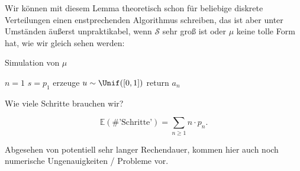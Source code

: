 \begin{oral}
    Wir können mit diesem Lemma theoretisch schon für beliebige diskrete Verteilungen einen enstprechenden Algorithmus schreiben, das ist aber unter Umständen äußerst unpraktikabel, wenn $\mathcal{S}$ sehr groß ist oder $μ$ keine tolle Form hat, wie wir gleich sehen werden:
\end{oral}

\begin{algorithm}[H]
    \DontPrintSemicolon

    \caption{Simulation von $μ$}
    \;
    $n = 1$ \;
    $s = p_1$ \;
    erzeuge $u \sim  \Unif([0,1])$ \;
    return $a_n$
\end{algorithm}

\begin{question}
    Wie viele Schritte brauchen wir?
\end{question}

\[
    \mathbb{E}(\# \text{'Schritte'}) = \sum_{n\geq 1} n\cdot p_n
.\]
\begin{oral}
    Abgesehen von potentiell sehr langer Rechendauer, kommen hier auch noch numerische Ungenauigkeiten / Probleme vor.
\end{oral}

